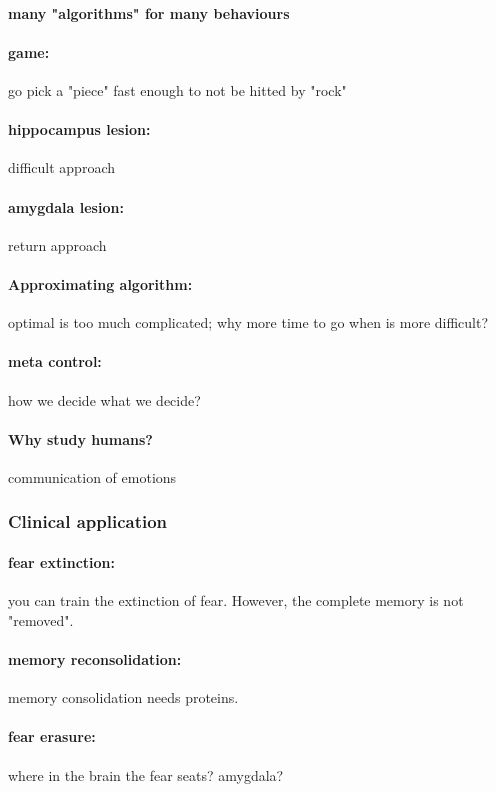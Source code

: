 \documentclass[12pt,article,oneside,a4paper]{memoir}
\begin{document}
\paragraph{many "algorithms" for many behaviours}

\paragraph{game:} go pick a "piece" fast enough to not be hitted by "rock"

\paragraph{hippocampus lesion:} difficult approach
\paragraph{amygdala lesion:} return approach

\paragraph{Approximating algorithm: } optimal is too much complicated; why more time to go when is more difficult?

\paragraph{meta control:} how we decide what we decide?

\paragraph{Why study humans?} communication of emotions

\subsubsection{Clinical application}
\paragraph{fear extinction:} you can train the extinction of fear. However, the complete memory is not "removed".
\paragraph{memory reconsolidation:} memory consolidation needs proteins.
\paragraph{fear erasure:} where in the brain the fear seats? amygdala?
\end{document}
